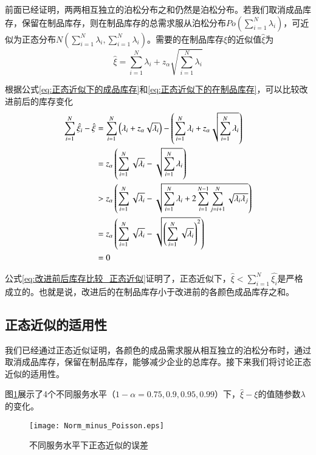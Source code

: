 前面已经证明，两两相互独立的泊松分布之和仍然是泊松分布。若我们取消成品库存，保留在制品库存，则在制品库存的总需求服从泊松分布$Po(\sum_{i=1}^N\lambda_i)$，可近似为正态分布$N(\sum_{i=1}^N\lambda_i,\sum_{i=1}^N\lambda_i)$。需要的在制品库存$\xi$的近似值$\hat{\xi}$为
\begin{equation}
\hat{\xi} = \sum_{i=1}^N\lambda_i + z_\alpha\sqrt{\sum_{i=1}^N\lambda_i}
\label{eq:正态近似下的在制品库存}
\end{equation}

根据公式\ref{eq:正态近似下的成品库存}和\ref{eq:正态近似下的在制品库存}，可以比较改进前后的库存变化
\begin{align}
\sum_{i=1}^N\hat{\xi_i} - \hat{\xi} &= \sum_{i=1}^N\left(\lambda_i + z_\alpha\sqrt{\lambda_i}\right) - \left(\sum_{i=1}^N\lambda_i + z_\alpha\sqrt{\sum_{i=1}^N\lambda_i}\right) \notag\\
&= z_\alpha\left(\sum_{i=1}^N\sqrt{\lambda_i}-\sqrt{\sum_{i=1}^N\lambda_i}\right) \notag\\
&> z_\alpha\left(\sum_{i=1}^N\sqrt{\lambda_i}-\sqrt{\sum_{i=1}^N\lambda_i+2\sum_{i=1}^{N-1}\sum_{j=i+1}^N\sqrt{\lambda_i\lambda_j}}\right) \notag\\
&= z_\alpha\left(\sum_{i=1}^N\sqrt{\lambda_i}-\sqrt{\left(\sum_{i=1}^N\sqrt{\lambda_i}\right)^2}\right) \notag\\
&=0
\label{eq:改进前后库存比较_正态近似}
\end{align}

公式\ref{eq:改进前后库存比较_正态近似}证明了，正态近似下，$\hat{\xi} < \sum_{i=1}^N\hat{\xi_i}$是严格成立的。也就是说，改进后的在制品库存小于改进前的各颜色成品库存之和。




\subsection{正态近似的适用性}

我们已经通过正态近似证明，各颜色的成品需求服从相互独立的泊松分布时，通过取消成品库存，保留在制品库存，能够减少企业的总库存。接下来我们将讨论正态近似的适用性。

图\ref{fig:正态近似的误差}展示了4个不同服务水平（$1-\alpha=0.75,0.9,0.95,0.99$）下，$\hat{\xi}-\xi$的值随参数$\lambda$的变化。

\begin{figure}[htb]
\centering
\texttt{[image: Norm\_minus\_Poisson.eps]}
\caption{不同服务水平下正态近似的误差}
\label{fig:正态近似的误差}
\end{figure}

